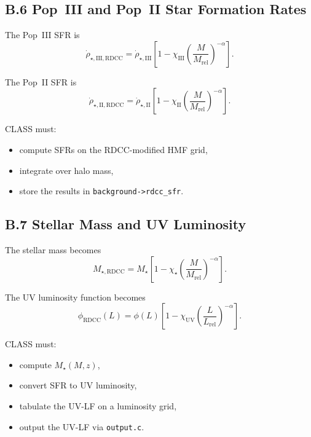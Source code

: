 \documentclass[11pt,a4paper]{article}
\begin{document}
\subsection*{B.6 Pop~III and Pop~II Star Formation Rates}

The Pop~III SFR is
\begin{equation}
    \dot{\rho}_{\star,\mathrm{III,RDCC}}
    = \dot{\rho}_{\star,\mathrm{III}}
      \left[
        1 - \chi_{\mathrm{III}}
        \left(\frac{M}{M_{\mathrm{rel}}}\right)^{-\alpha}
      \right].
\end{equation}

The Pop~II SFR is
\begin{equation}
    \dot{\rho}_{\star,\mathrm{II,RDCC}}
    = \dot{\rho}_{\star,\mathrm{II}}
      \left[
        1 - \chi_{\mathrm{II}}
        \left(\frac{M}{M_{\mathrm{rel}}}\right)^{-\alpha}
      \right].
\end{equation}

CLASS must:

\begin{itemize}
    \item compute SFRs on the RDCC-modified HMF grid,
    \item integrate over halo mass,
    \item store the results in \texttt{background->rdcc\_sfr}.
\end{itemize}

\subsection*{B.7 Stellar Mass and UV Luminosity}

The stellar mass becomes
\begin{equation}
    M_{\star,\mathrm{RDCC}}
    = M_{\star}
      \left[
        1 - \chi_{\star}
        \left(\frac{M}{M_{\mathrm{rel}}}\right)^{-\alpha}
      \right].
\end{equation}

The UV luminosity function becomes
\begin{equation}
    \phi_{\mathrm{RDCC}}(L)
    = \phi(L)
      \left[
        1 - \chi_{\mathrm{UV}}
        \left(\frac{L}{L_{\mathrm{rel}}}\right)^{-\alpha}
      \right].
\end{equation}

CLASS must:

\begin{itemize}
    \item compute $M_{\star}(M,z)$,
    \item convert SFR to UV luminosity,
    \item tabulate the UV-LF on a luminosity grid,
    \item output the UV-LF via \texttt{output.c}.
\end{itemize}
\end{document}
